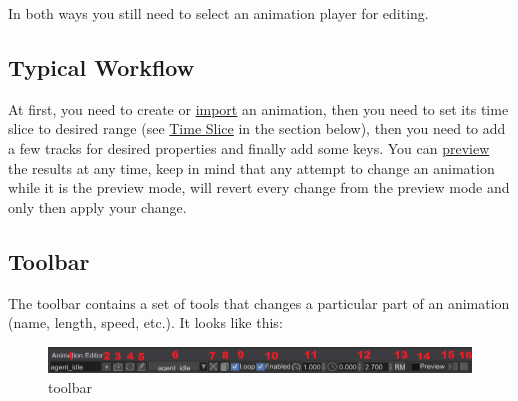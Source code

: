 \documentclass[
]{book}
\theoremstyle{definition}
\theoremstyle{definition}
\theoremstyle{definition}
\theoremstyle{definition}
\theoremstyle{remark}
\begin{document}
In both ways you still need to select an animation player for editing.

\subsection{Typical Workflow}\label{typical-workflow}

At first, you need to create or \hyperref[animation-importing]{import} an animation, then you need to set its time slice to desired range (see \hyperref[toolbar]{Time Slice} in the section below), then you need to add a few tracks for desired properties and finally add some keys. You can \hyperref[preview-mode]{preview} the results at any time, keep in mind that any attempt to change an animation while it is the preview mode, will revert every change from the preview mode and only then apply your change.

\subsection{Toolbar}\label{toolbar}

The toolbar contains a set of tools that changes a particular part of an animation (name, length, speed, etc.). It looks like this:

\begin{figure}
\centering
\includegraphics{images/animation/ae_toolbar.png}
\caption{toolbar}
\end{figure}
\end{document}
